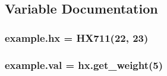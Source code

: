 \subsection{Variable Documentation}
\subsubsection[{\texorpdfstring{hx}{hx}}]{\setlength{\rightskip}{0pt plus 5cm}example.\+hx = {\bf H\+X711}(22, 23)}\hypertarget{namespaceexample_a5277d4ae36a1306670b701e9c96bfcf8}{}\label{namespaceexample_a5277d4ae36a1306670b701e9c96bfcf8}
\subsubsection[{\texorpdfstring{val}{val}}]{\setlength{\rightskip}{0pt plus 5cm}example.\+val = hx.\+get\+\_\+weight(5)}\hypertarget{namespaceexample_a330d11200a5803a1f82055e55e160fc2}{}\label{namespaceexample_a330d11200a5803a1f82055e55e160fc2}
